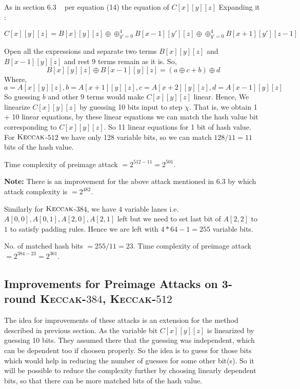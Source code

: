 \documentclass[runningheads]{llncs}
\newcommand{\KECCAK}{\mbox{\textsc{Keccak}}}
\begin{document}
    As in section 6.3 ~\cite{guo2016linear} per equation (14) the equation of $C[x][y][z]$
    Expanding it :

    \[
        C[x][y][z] = B[x][y][z] \oplus \oplus_{y' = 0}^{4} B[x-1][y'][z] \oplus \oplus_{y' = 0}^{4} B[x+1][y'][z-1]
    \]
    
		Open all the expressions and separate two terms $B[x][y][z]$ and $B[x-1][y][z]$ and rest 9 terms remain as it is.
    So, 
		\[ B[x][y][z] \oplus B[x-1][y][z] = (a \oplus c + b) \oplus d
    \]
    Where,
		 \[
        a = A[x][y][z], b = A[x + 1][y][z], c = A[x + 2][y][z], d = A[x - 1][y][z]
    \]
    So guessing $b$ and other 9 terms would make $C[x][y][z]$ linear. Hence, We linearize $C[x][y][z]$ by guessing 10 bits input to step $\chi$. That is, we obtain 1 + 10 linear equations, by these linear equations we can match the hash value bit corresponding to $C[x][y][z]$. So 11 linear equations for 1 bit of hash value. For $\KECCAK$-$512$ we have only 128 variable bits, so we can match $128/11 = 11$ bits of the hash value.
    
    Time complexity of preimage attack $= 2^{512 - 11} = 2^{501}$.

    \textbf{Note:} There is an improvement for the above attack mentioned in 6.3 by which attack complexity is $= 2^{482}$.

    Similarly for $\KECCAK$-$384$, we have 4 variable lanes i.e. $A[0,0], A[0,1], A[2,0], A[2,1]$ left but we need to set last bit of $A[2,2]$ to $1$ to satisfy padding rules. Hence we are left with $4*64 - 1 = 255$ variable bits.
	
	No. of matched hash bits $ = 255/11 = 23 $. Time complexity of preimage attack $= 2^{384 - 23} = 2^{361}$.

\subsection{Improvements for Preimage Attacks on 3-round \KECCAK-$384$, \KECCAK-$512$}

    The idea for improvements of these attacks is an extension for the method described in previous section. As the variable bit $C[x][y][z]$ is linearized by guessing 10 bits. They assumed there that the guessing was independent, which can be dependent too if choosen properly. So the idea is to guess for those bits which would help in reducing the number of guesses for some other bit(s). So it will be possible to reduce the complexity further by choosing linearly dependent bits, so that there can be more matched bits of the hash value.
\end{document}
